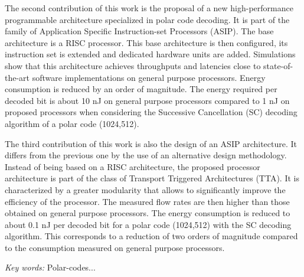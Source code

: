The second contribution of this work is the proposal of a new high-performance programmable architecture specialized in polar code decoding. It is part of the family of Application Specific Instruction-set Processors (ASIP). The base architecture is a RISC processor. This base architecture is then configured, its instruction set is extended and dedicated hardware units are added. Simulations show that this architecture achieves throughputs and latencies close to state-of-the-art software implementations on general purpose processors. Energy consumption is reduced by an order of magnitude. The energy required per decoded bit is about 10 nJ on general purpose processors compared to 1 nJ on proposed processors when considering the Successive Cancellation (SC) decoding algorithm of a polar code (1024,512).

The third contribution of this work is also the design of an ASIP architecture. It differs from the previous one by the use of an alternative design methodology. Instead of being based on a RISC architecture, the proposed processor architecture is part of the class of Transport Triggered Architectures (TTA). It is characterized by a greater modularity that allows to significantly improve the efficiency of the processor. The measured flow rates are then higher than those obtained on general purpose processors. The energy consumption is reduced to about 0.1 nJ per decoded bit for a polar code (1024,512) with the SC decoding algorithm. This corresponds to a reduction of two orders of magnitude compared to the consumption measured on general purpose processors.

\vskip0.5cm
\emph{Key words:} Polar-codes...
